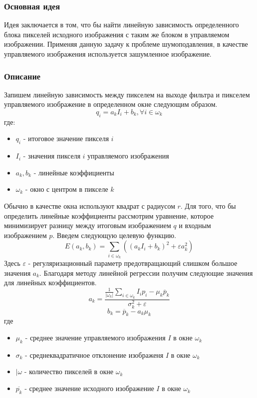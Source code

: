 \subsubsection{Основная идея}
Идея заключается в том, что бы найти линейную зависимость определенного блока пикселей исходного изображения с таким же блоком в управляемом изображении. Применяя данную задачу к проблеме шумоподавления, в качестве управляемого изображения используется зашумленное изображение.
\subsubsection{Описание}
Запишем линейную зависимость между пикселем на выходе фильтра и пикселем управляемого изображение в определенном окне следующим образом.
\begin{equation}\label{eq:Guided}
	q_i=a_kI_i+b_k, \forall i \in \omega_k
\end{equation} 
где: 
\begin{itemize}
	\item $q_i$ - итоговое значение пикселя $i$
	\item $I_i$ - значения пикселя $i$ управляемого изображения
	\item $a_k, b_k$ - линейные коэффициенты
	\item $\omega_k$ - окно с центром в пикселе $k$
\end{itemize}
Обычно в качестве окна используют квадрат с радиусом $r$.
Для того, что бы определить линейные коэффициенты рассмотрим уравнение, которое минимизирует разницу между итоговым изображением $q$ и входным изображением $p$. Введем следующую целевую функцию.
\begin{equation}
	E(a_k,b_k) = \sum_{i\in \omega_k}((a_kI_i+b_k)^2+\varepsilon a_k^2)
\end{equation}
Здесь $\varepsilon$ - регуляризационный параметр предотвращающий слишком большое значения $a_k$. Благодаря методу линейной регрессии получим следующие значения для линейных коэффициентов.
\begin{equation}
	a_k=\frac{\frac{1}{|\omega_k|}\sum_{i \in \omega_k}I_ip_i-\mu_k\overline{p}_k}{\sigma_k^2 + \varepsilon}
\end{equation}
\begin{equation}
b_k=\overline{p}_k-a_k\mu_k
\end{equation}
где
\begin{itemize}
	\item $\mu_k$ - среднее значение управляемого изображения $I$ в окне $\omega_k$
	\item $\sigma_k$ - среднеквадратичное отклонение изображеня $I$ в окне $\omega_k$
	\item $|\omega$ - количество пикселей в окне $\omega_k$ 
	\item $\overline{p_k}$ - среднее значение исходного изображение $I$ в окне $\omega_k$
\end{itemize}
